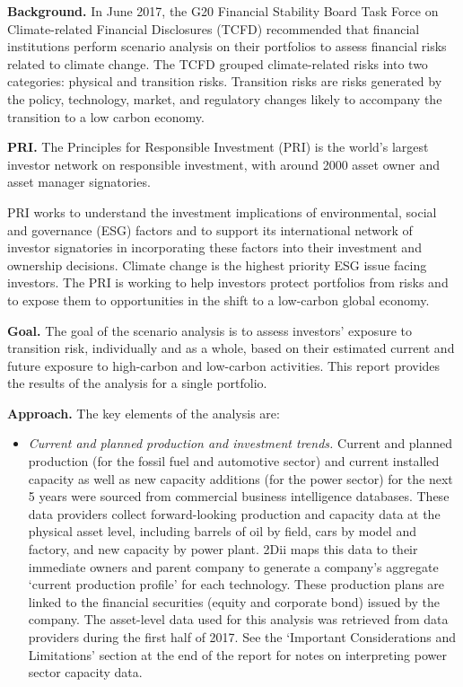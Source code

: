 \documentclass[10pt,table,a4]{article}\usepackage[]{graphicx}\usepackage[]{color}
\begin{document}
	\begin{multicols}{2}
		\textbf{Background.} In June 2017, the G20 Financial Stability Board Task Force on Climate-related Financial Disclosures (TCFD) recommended that financial institutions perform scenario analysis on their portfolios to assess financial risks related to climate change. The TCFD grouped climate-related risks into two categories: physical and transition risks. Transition risks are risks generated by the policy, technology, market, and regulatory changes likely to accompany the transition to a low carbon economy.
		
		\textbf{PRI. }The Principles for Responsible Investment (PRI) is the world's largest investor network on responsible investment, with around 2000 asset owner and asset manager signatories. 
		
		PRI works to understand the investment implications of environmental, social and governance (ESG) factors and to support its international network of investor signatories in incorporating these factors into their investment and ownership decisions. Climate change is the highest priority ESG issue facing investors. The PRI is working to help investors protect portfolios from risks and to expose them to opportunities in the shift to a low-carbon global economy. 
		
		\textbf{Goal.} The goal of the scenario analysis is to assess investors' exposure to transition risk, individually and as a whole, based on their estimated current and future exposure to high-carbon and low-carbon activities. This report provides the results of the analysis for a single portfolio.
		
		\textbf{Approach.} The key elements of the analysis are:
		
		\begin{itemize}
			\item{\textit{Current and planned production and investment trends.} Current and planned production (for the fossil fuel and automotive sector) and current installed capacity as well as new capacity additions (for the power sector) for the next 5 years were sourced from commercial business intelligence databases. These data providers collect forward-looking production and capacity data at the physical asset level, including barrels of oil by field, cars by model and factory, and new capacity by power plant. 2Dii maps this data to their immediate owners and parent company to generate a company's aggregate `current production profile' for each technology. These production plans are linked to the financial securities (equity and corporate bond) issued by the company. The asset-level data used for this analysis was retrieved from data providers during the first half of 2017. See the `Important Considerations and Limitations' section at the end of the report for notes on interpreting power sector capacity data.}
			

\end{itemize}
\end{multicols}
\end{document}
